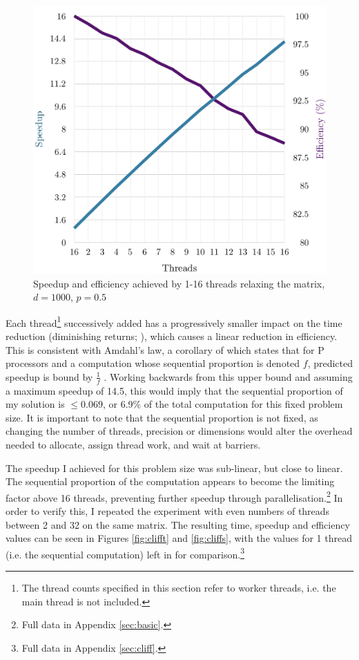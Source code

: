 \documentclass[12pt]{article}
\begin{document}
\begin{figure}[!htb]
\begin{minipage}{0.53\textwidth}
       \hspace{-0.8cm}\includegraphics[width=1.1\textwidth]{img/basic-threads-speedup.pdf}
        \centering\caption{Speedup and efficiency achieved by 1-16 threads relaxing the matrix, $d=1000$, $p=0.5$}
        \label{fig:basics}
    \end{minipage}
\end{figure}

Each thread\footnote{The thread counts specified in this section refer to worker threads, i.e. the main thread is not included.} successively added has a progressively smaller impact on the time reduction (diminishing returns; \citep{Amdahl}), which causes a linear reduction in efficiency. This is consistent with Amdahl's law, a corollary of which states that for P processors and a computation whose sequential proportion is denoted $f$, predicted speedup is bound by $\frac{1}{f}$ \citep{springer}. Working backwards from this upper bound and assuming a maximum speedup of 14.5, this would imply that the sequential proportion of my solution is $\leq 0.069$, or 6.9\% of the total computation for this fixed problem size. It is important to note that the sequential proportion is not fixed, as changing the number of threads, precision or dimensions would alter the overhead needed to allocate, assign thread work, and wait at barriers.

The speedup I achieved for this problem size was sub-linear, but close to linear. The sequential proportion of the computation appears to become the limiting factor above 16 threads, preventing further speedup through parallelisation.\footnote{Full data in Appendix \ref{sec:basic}.} In order to verify this, I repeated the experiment with even numbers of threads between 2 and 32 on the same matrix. The resulting time, speedup and efficiency values can be seen in Figures \ref{fig:clifft} and \ref{fig:cliffs}, with the values for 1 thread (i.e. the sequential computation) left in for comparison.\footnote{Full data in Appendix \ref{sec:cliff}.}
\end{document}
